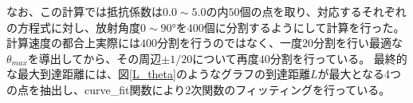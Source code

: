 \documentclass[a4j, dvipdfm]{jarticle}
\begin{document}
\begin{enumerate}[問題(1)]
        \vspace{0.5cm}
        なお、この計算では抵抗係数は$0.0\sim 5.0$の内$50$個の点を取り、対応するそれぞれの方程式に対し、放射角度$0\sim 90$°を$400$個に分割するようにして計算を行った。計算速度の都合上実際には$400$分割を行うのではなく、一度$20$分割を行い最適な$\theta_{max}$を導出してから、その周辺$\pm 1/20$について再度$40$分割を行っている。
        最終的な最大到達距離には、図\ref{L_theta}のようなグラフの到達距離$L$が最大となる4つの点を抽出し、curve\_fit関数により2次関数のフィッティングを行っている。


\end{enumerate}
\end{document}
